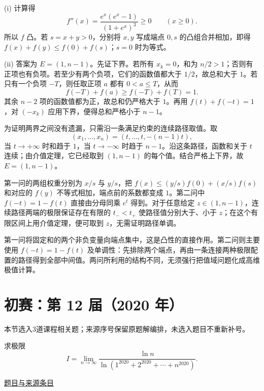 \documentclass[UTF8,12pt,a4paper,fontset=fandol]{ctexart}
\begin{document}
\begin{solve}\label{ans:ch10-11th-A:6}

(i) 计算得
\[
f''(x)=\frac{e^x(e^x-1)}{(1+e^x)^3}\geq0\qquad(x\geq0).
\]
所以 $f$ 凸。若 $s=x+y>0$，分别将 $x,y$ 写成端点 $0,s$ 的凸组合并相加，即得 $f(x)+f(y)\leq f(0)+f(s)$；$s=0$ 时为等式。

(ii) 答案为 $E=(1,n-1)$。先证下界。若所有 $x_k=0$，和为 $n/2>1$；否则有正项也有负项。若至少有两个负项，它们的函数值都大于 $1/2$，故总和大于 $1$。若只有一个负项 $-T$，则任取正项 $a$ 都有 $0<a\leq T$，从而
\[
f(-T)+f(a)\geq f(-T)+f(T)=1.
\]
其余 $n-2$ 项的函数值都为正，故总和仍严格大于 $1$。再用 $f(t)+f(-t)=1$，对 $(-x_k)$ 应用下界，便得总和严格小于 $n-1$。

为证明两界之间没有遗漏，只需沿一条满足约束的连续路径取值。取
\[
(x_1,\ldots,x_n)=(t,\ldots,t,-(n-1)t),
\]
当 $t\to+\infty$ 时和趋于 $1$，当 $t\to-\infty$ 时趋于 $n-1$。沿这条路径，函数和关于 $t$ 连续；由介值定理，它已经取到 $(1,n-1)$ 的每个值。结合严格上下界，故 $E=(1,n-1)$。

第一问的两组权重分别为 $x/s$ 与 $y/s$，把 $f(x)\le(y/s)f(0)+(x/s)f(s)$ 和对应的 $f(y)$ 不等式相加，端点前的系数都变成 $1$。第二问中 $f(-t)=1-f(t)$ 直接由分母同乘 $e^t$ 得到。对于任意给定 $z\in(1,n-1)$，连续路径两端的极限保证存在有限的 $t_-<t_+$ 使路径值分别大于、小于 $z$；在这个有限区间上用介值定理，便可取到 $z$，无需证明路径单调。

\end{solve}

\begin{remark}[方法与条件]第一问将固定和的两个非负变量向端点集中，这是凸性的直接作用。第二问则主要使用 $f(-t)=1-f(t)$ 及单调性：先排除两个端点，再由一条连接两种极限配置的路径得到全部中间值。两问所利用的结构不同，无须强行把值域问题化成高维极值计算。\end{remark}

\section{初赛：第 12 届（2020 年）}

本节选入3道课程相关题；来源序号保留原题解编排，未选入题目不重新补号。

\begin{example}[来源序号2]\label{ex:ch09-12th-A:2}\label{pr:ch09-12th-A:2}

求极限
\[
I=\lim_{n\to\infty}\frac{\ln n}{\ln\left(1^{2020}+2^{2020}+\cdots+n^{2020}\right)}.
\]

\par\href{https://github.com/lzxcr/cmc-mathematics/blob/64916fa1fdbc3e444a652eca204d5669058ee321/src/problems/preliminary/12/02.md}{题目与来源条目}

\end{example}
\end{document}
